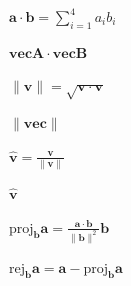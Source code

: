 \documentclass{article}
\begin{document}
$ \mathbf{a} \cdot \mathbf{b} = \sum_{i=1}^{4} a_i b_i $
\pagebreak

$ \mathbf{vecA} \cdot \mathbf{vecB} $
\pagebreak

$ \|\mathbf{v}\| = \sqrt{\mathbf{v} \cdot \mathbf{v}} $
\pagebreak

$ \|\mathbf{vec}\| $
\pagebreak

$ \mathbf{\hat{v}} = \frac{\mathbf{v}}{\|\mathbf{v}\|} $
\pagebreak

$ \mathbf{\hat{v}} $
\pagebreak

$ \text{proj}_{\mathbf{b}} \mathbf{a} = \frac{\mathbf{a} \cdot
\mathbf{b}}{\|\mathbf{b}\|^2} \mathbf{b} $
\pagebreak

$ \text{rej}_{\mathbf{b}} \mathbf{a} = \mathbf{a} - \text{proj}_{\mathbf{b}} \mathbf{a} $
\pagebreak
\end{document}
